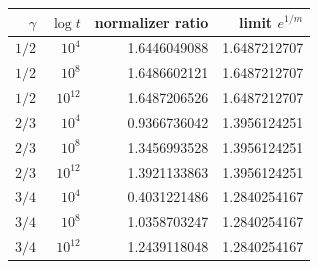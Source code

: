 \begin{tabular}{rrrr}
\toprule
$\gamma$ & $\log t$ & normalizer ratio & limit $e^{1/m}$\\
\midrule
$1/2$ & $10^4$ & 1.6446049088 & 1.6487212707\\
$1/2$ & $10^8$ & 1.6486602121 & 1.6487212707\\
$1/2$ & $10^12$ & 1.6487206526 & 1.6487212707\\
$2/3$ & $10^4$ & 0.9366736042 & 1.3956124251\\
$2/3$ & $10^8$ & 1.3456993528 & 1.3956124251\\
$2/3$ & $10^12$ & 1.3921133863 & 1.3956124251\\
$3/4$ & $10^4$ & 0.4031221486 & 1.2840254167\\
$3/4$ & $10^8$ & 1.0358703247 & 1.2840254167\\
$3/4$ & $10^12$ & 1.2439118048 & 1.2840254167\\
\bottomrule
\end{tabular}
